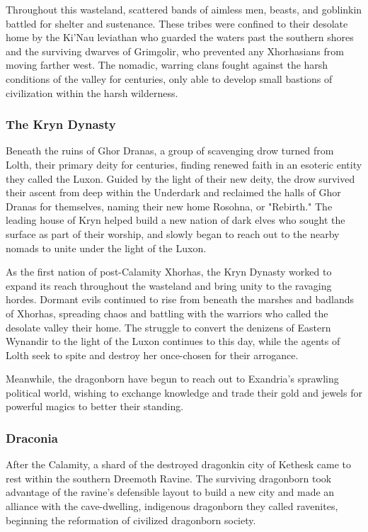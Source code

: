 \documentclass[10pt,a4paper,twoside,bg=print,twocolumn,openany,nodeprecatedcode]{dndbook}
\begin{document}
Throughout this wasteland, scattered bands of aimless men, beasts, and goblinkin battled for shelter and sustenance. These tribes were confined to their desolate home by the Ki'Nau leviathan who guarded the waters past the southern shores and the surviving dwarves of Grimgolir, who prevented any Xhorhasians from moving farther west. The nomadic, warring clans fought against the harsh conditions of the valley for centuries, only able to develop small bastions of civilization within the harsh wilderness.

\subsubsection{The Kryn Dynasty}
Beneath the ruins of Ghor Dranas, a group of scavenging drow turned from Lolth, their primary deity for centuries, finding renewed faith in an esoteric entity they called the Luxon. Guided by the light of their new deity, the drow survived their ascent from deep within the Underdark and reclaimed the halls of Ghor Dranas for themselves, naming their new home Rosohna, or "Rebirth." The leading house of Kryn helped build a new nation of dark elves who sought the surface as part of their worship, and slowly began to reach out to the nearby nomads to unite under the light of the Luxon.

As the first nation of post-Calamity Xhorhas, the Kryn Dynasty worked to expand its reach throughout the wasteland and bring unity to the ravaging hordes. Dormant evils continued to rise from beneath the marshes and badlands of Xhorhas, spreading chaos and battling with the warriors who called the desolate valley their home. The struggle to convert the denizens of Eastern Wynandir to the light of the Luxon continues to this day, while the agents of Lolth seek to spite and destroy her once-chosen for their arrogance.

Meanwhile, the dragonborn have begun to reach out to Exandria's sprawling political world, wishing to exchange knowledge and trade their gold and jewels for powerful magics to better their standing.

\subsubsection{Draconia}
After the Calamity, a shard of the destroyed dragonkin city of Kethesk came to rest within the southern Dreemoth Ravine. The surviving dragonborn took advantage of the ravine's defensible layout to build a new city and made an alliance with the cave-dwelling, indigenous dragonborn they called ravenites, beginning the reformation of civilized dragonborn society.
\end{document}
